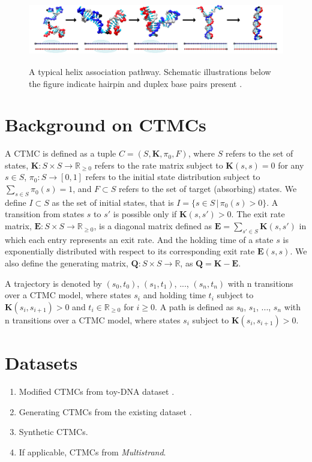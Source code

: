 \documentclass{article}
\newcommand{\vect}[1]{\boldsymbol{#1}}
\newcommand\R{\mathbb R}
\newcommand\K{\vect{K}}
\def\R{\mathbb{R}}
\begin{document}
\begin{figure}[h]
	\centering
	\vspace*{0.3cm}
	\includegraphics[height=3cm]{latexplots/duplexformation.png}\hspace*{1cm}
	\caption{A typical helix association pathway. Schematic illustrations below the figure indicate hairpin and duplex base pairs present \cite{schreck}.}
	\vspace*{-.3cm}
	\label{fig:duplex}
\end{figure}


\section{Background on CTMCs}
A CTMC is defined as a tuple $C = (S, \K, \pi_0, F)$, where $S$ refers to the set of states, $\K : S\times S \to \R_{\ge 0}$ refers to the rate matrix subject to $\K(s,s) = 0$ for any $s\in S$,  $\pi_0 : S\to [0,1]$ refers to the initial state distribution subject to $\sum_{s\in S} \pi_0(s) = 1$, and $F \subset S$ refers to the set of target (absorbing) states. We define $I \subset S$ as the set of initial states, that is $I = \{ s\in S \, | \, \pi_0(s) > 0\}$. A transition from states $s$ to $s'$ is possible only if $\K(s,s') > 0$. The exit rate matrix, $\vect{E} : S \times S \to \R_{\ge 0}$, is a diagonal matrix defined as $\vect{E} = \sum_{s'\in S} \K(s,s')$ in which each entry represents an exit rate. And the holding time of a state $s$ is exponentially distributed with respect to its corresponding exit rate $\vect{E}(s,s)$. We also define the generating matrix, $\vect{Q} : S\times S \to \R$, as $\vect{Q} = \K-\vect{E}$.

A trajectory is denoted by $(s_0,t_0)$, $(s_1,t_1)$, ..., $(s_n,t_n)$ with n transitions over a CTMC model, where states $s_i$ and holding time $t_i$ subject to $\K(s_i,s_{i+1}) > 0$ and $t_i \in \R_{\geq 0}$ for $i \geq 0$. A path is defined as $s_0$, $s_1$, ..., $s_n$ with n transitions over a CTMC model, where states $s_i$ subject to $\K(s_i,s_{i+1}) > 0$. 


\section{Datasets}
\begin{enumerate}
	\item Modified CTMCs from toy-DNA dataset \cite{DNA23}.
	\item Generating CTMCs from the existing dataset \cite{schreck}.
	\item Synthetic CTMCs.
	\item If applicable, CTMCs from \textit{Multistrand}.
\end{enumerate}
\end{document}
